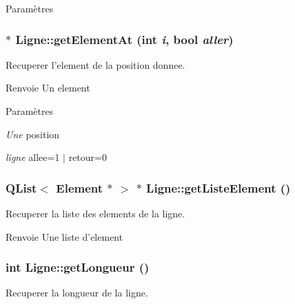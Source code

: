\begin{DoxyParams}{Paramètres}
\item[{\em }]\end{DoxyParams}
\hypertarget{classLigne_ad1e50a586085b6d90142cebf0f6b445c}{
\subsubsection[{getElementAt}]{ $\ast$ Ligne::getElementAt (int {\em i}, \/  bool {\em aller})}}
\label{classLigne_ad1e50a586085b6d90142cebf0f6b445c}


Recuperer l'element de la position donnee. 

\begin{DoxyReturn}{Renvoie}
Un element 
\end{DoxyReturn}

\begin{DoxyParams}{Paramètres}
\item[{\em Une}]position \item[{\em ligne}]allee=1 $|$ retour=0 \end{DoxyParams}
\hypertarget{classLigne_a23be9d51e86eac91160cec43bf2edbe0}{
\subsubsection[{getListeElement}]{\setlength{\rightskip}{0pt plus 5cm}QList$<$ {\bf Element} $\ast$ $>$ $\ast$ Ligne::getListeElement ()}}
\label{classLigne_a23be9d51e86eac91160cec43bf2edbe0}


Recuperer la liste des elements de la ligne. 

\begin{DoxyReturn}{Renvoie}
Une liste d'element 
\end{DoxyReturn}
\hypertarget{classLigne_a092ab7c50400c0580c23c9dcf3ba795b}{
\subsubsection[{getLongueur}]{\setlength{\rightskip}{0pt plus 5cm}int Ligne::getLongueur ()}}
\label{classLigne_a092ab7c50400c0580c23c9dcf3ba795b}


Recuperer la longueur de la ligne. 

